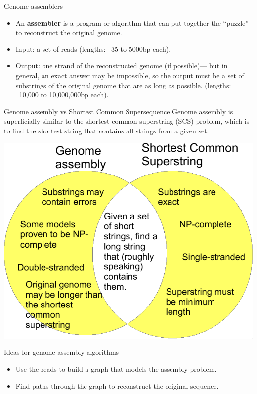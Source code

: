 \documentclass[xcolor=dvipsnames]{beamer}
\begin{document}
\begin{frame}{Genome assemblers}
	\begin{itemize}
		\item An {\bf assembler} is a program or algorithm that can put together the
		``puzzle'' to reconstruct the original genome.
		\item  Input: a set of reads (lengths: ~35 to 5000bp each).
		\item  Output: one strand of the reconstructed genome (if possible)--- but
		in general, an exact answer may be impossible, so the output must be a set
		of substrings of the original genome that are as long as possible. (lengths:
		~10,000 to 10,000,000bp each).
	\end{itemize}
\end{frame}

\begin{frame}{Genome assembly vs Shortest Common Supersequence}
	Genome assembly is superficially similar to the shortest common superstring
	(SCS) problem, which is to find the shortest string that contains all strings
	from a given set.
	\begin{center}
	\includegraphics[scale=0.6]{venn-crop.pdf}
	\end{center}
\end{frame}

\begin{frame}{Ideas for genome assembly algorithms}

	\begin{itemize}
		\item Use the reads to build a graph that models the assembly problem.
		\item Find paths through the graph to reconstruct the original sequence.
	\end{itemize}
\end{frame}
\end{document}
